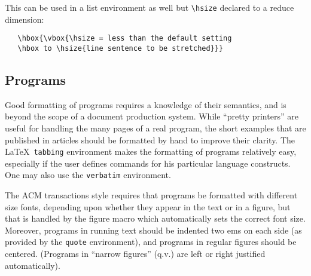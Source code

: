 \documentclass[hyperref]{acmtrans2e}
\begin{document}
This can be used in a list environment as well but \verb|\hsize| declared to a reduce
dimension:

\begin{verbatim}
   \hbox{\vbox{\hsize = less than the default setting
   \hbox to \hsize{line sentence to be stretched}}}
\end{verbatim}

\subsection{Programs}

Good formatting of programs requires a knowledge of their semantics,
and is beyond the scope of a document production system.  While
``pretty printers'' are useful for handling the many pages of a real
program, the short examples that are published in articles should be
formatted by hand to improve their clarity.  The \LaTeX\ {\tt tabbing}
environment makes the formatting of programs relatively easy,
especially if the user defines commands for his particular language
constructs.
One may also use the {\tt verbatim} environment.

The ACM transactions style requires that programs be formatted with
different size fonts, depending upon whether they appear in the text or
in a figure, but that is handled by the figure macro which
automatically sets the correct font size.
Moreover, programs in running text should be indented two ems 
on each side (as provided by the {\tt quote} environment), and
programs in regular figures should be centered.
(Programs in ``narrow figures'' (q.v.) are left or right justified
automatically).
\end{document}
